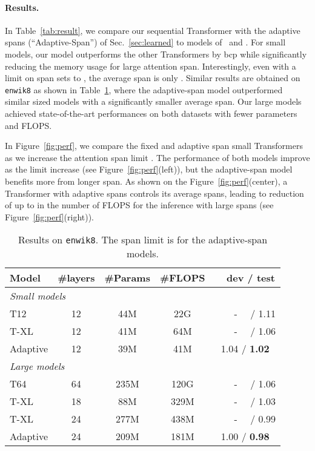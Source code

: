 \documentclass[11pt,a4paper]{article}
\newcommand{\fig}[1]{Figure~\ref{fig:#1}}
\newcommand{\tab}[1]{Table~\ref{tab:#1}}
\begin{document}
\paragraph{Results.}
In \tab{result}, we compare our sequential Transformer with the adaptive spans (``Adaptive-Span'') of Sec.~\ref{sec:learned} to models of~\citet{al2018character} and \citet{dai2018transformer}.
For small models, our model outperforms the other Transformers  by  bcp while significantly reducing the memory usage for large attention span.
Interestingly, even with a limit on span sets to , the average span is only .
Similar results are obtained on \texttt{enwik8} as shown in \tab{enwiki}, where the adaptive-span model outperformed similar sized models with a significantly smaller average span. Our large models achieved state-of-the-art performances on both datasets with fewer parameters and FLOPS.

In \fig{perf}, we compare the fixed and adaptive span small Transformers as we increase the attention span limit .
The performance of both models improve as the limit increase (see \fig{perf}(left)), but the adaptive-span model benefits more from longer span.
As shown on the \fig{perf}(center), a Transformer with adaptive spans controls its average spans, leading to reduction of up to  in the number of FLOPS for the inference with large spans (see \fig{perf}(right)).

\begin{table}[t]
\centering
\setlength{\tabcolsep}{2.5pt}
\begin{tabular}{lcccc}
  \toprule
  Model & \#layers & \#Params & \#FLOPS & ~~dev / test \\
  \midrule
  \multicolumn{5}{l}{\emph{Small models}}\\
  T12 & 12 & 44M & 22G & ~~~~-~~ / 1.11 \\
  T-XL & 12 & 41M & 64M & ~~~~-~~ / 1.06 \\
  Adaptive & 12 & 39M & 41M & 1.04 / \bf 1.02 \\
  \midrule
  \multicolumn{5}{l}{\emph{Large models}}\\
  T64 & 64 & 235M & 120G & ~~~~-~~ / 1.06 \\
  T-XL & 18 & 88M & 329M & ~~~~-~~ / 1.03 \\
  T-XL & 24 & 277M & 438M & ~~~~-~~ / 0.99 \\
  Adaptive & 24 & 209M & 181M & 1.00 / \bf 0.98 \\
  \bottomrule
\end{tabular}
  \caption{
    Results on \texttt{enwik8}. The span limit is  for the adaptive-span models.
  }
\label{tab:enwiki}
\end{table}
\end{document}

